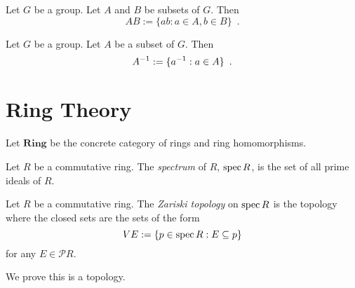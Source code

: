 \begin{df}
Let $G$ be a group. Let $A$ and $B$ be subsets of $G$. Then
\[ AB := \{ ab : a \in A, b \in B \} \enspace . \]
\end{df}

\begin{df}
Let $G$ be a group. Let $A$ be a subset of $G$. Then
\[ {A}^{-1} := \{ {a}^{-1} : a \in A \} \enspace . \]
\end{df}

\chapter{Ring Theory}

\begin{df}
Let $\mathbf{Ring}$ be the concrete category of rings and ring homomorphisms.
\end{df}

\begin{df}[Spectrum]
Let $R$ be a commutative ring. The \emph{spectrum} of $R$, $\operatorname{spec} R$, is the set of all prime ideals of $R$.
\end{df}

\begin{df}
Let $R$ be a commutative ring. The \emph{Zariski topology} on $\operatorname{spec} R$ is the topology where the closed sets are the sets of the form
\[ VE := \{ p \in \operatorname{spec} R : E \subseteq p \} \]
for any $E \in \mathcal{P} R$.

We prove this is a topology.
\end{df}

